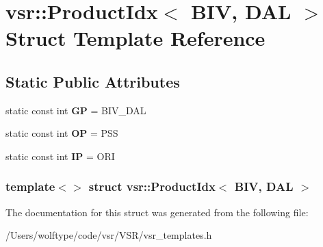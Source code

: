 \hypertarget{structvsr_1_1_product_idx_3_01_b_i_v_00_01_d_a_l_01_4}{\section{vsr\-:\-:Product\-Idx$<$ B\-I\-V, D\-A\-L $>$ Struct Template Reference}
\label{structvsr_1_1_product_idx_3_01_b_i_v_00_01_d_a_l_01_4}
}
\subsection*{Static Public Attributes}
\begin{DoxyCompactItemize}
\item 
\hypertarget{structvsr_1_1_product_idx_3_01_b_i_v_00_01_d_a_l_01_4_a70a144fd1b12ed794b093f9b90360e9f}{static const int {\bfseries G\-P} = B\-I\-V\-\_\-\-D\-A\-L}\label{structvsr_1_1_product_idx_3_01_b_i_v_00_01_d_a_l_01_4_a70a144fd1b12ed794b093f9b90360e9f}

\item 
\hypertarget{structvsr_1_1_product_idx_3_01_b_i_v_00_01_d_a_l_01_4_aafb428adbe180dd433e3b1e3f36f4f81}{static const int {\bfseries O\-P} = P\-S\-S}\label{structvsr_1_1_product_idx_3_01_b_i_v_00_01_d_a_l_01_4_aafb428adbe180dd433e3b1e3f36f4f81}

\item 
\hypertarget{structvsr_1_1_product_idx_3_01_b_i_v_00_01_d_a_l_01_4_a6c25058b8e46e743a1c5c240d4dc45fc}{static const int {\bfseries I\-P} = O\-R\-I}\label{structvsr_1_1_product_idx_3_01_b_i_v_00_01_d_a_l_01_4_a6c25058b8e46e743a1c5c240d4dc45fc}

\end{DoxyCompactItemize}
\subsubsection*{template$<$$>$ struct vsr\-::\-Product\-Idx$<$ B\-I\-V, D\-A\-L $>$}



The documentation for this struct was generated from the following file\-:\begin{DoxyCompactItemize}
\item 
/\-Users/wolftype/code/vsr/\-V\-S\-R/vsr\-\_\-templates.\-h\end{DoxyCompactItemize}
